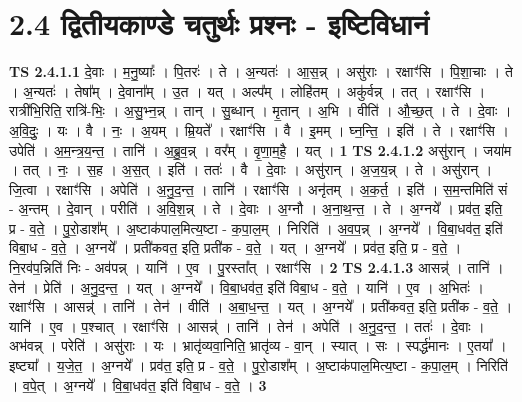 \documentclass[17pt]{extarticle}
\begin{document}
\section*{ 2.4      द्वितीयकाण्डे चतुर्थः प्रश्नः - इष्टिविधानं }
                                \textbf{ TS 2.4.1.1} \newline
                  दे॒वाः । म॒नु॒ष्याः᳚ । पि॒तरः॑ । ते । अ॒न्यतः॑ । आ॒स॒न्न् । असु॑राः । रक्षाꣳ॑सि । पि॒शा॒चाः । ते । अ॒न्यतः॑ । तेषा᳚म् । दे॒वाना᳚म् । उ॒त । यत् । अल्प᳚म् । लोहि॑तम् । अकु॑र्वन्न् । तत् । रक्षाꣳ॑सि । रात्री॑भि॒रिति॒ रात्रि॑-भिः॒ । अ॒सु॒भ्न॒न्न् । तान् । सु॒ब्धान् । मृ॒तान् । अ॒भि । वीति॑ । औ॒च्छ॒त् । ते । दे॒वाः । अ॒वि॒दुः॒ । यः । वै । नः॒ । अ॒यम् । म्रि॒यते᳚ । रक्षाꣳ॑सि । वै । इ॒मम् । घ्न॒न्ति॒ । इति॑ । ते । रक्षाꣳ॑सि । उपेति॑ । अ॒म॒न्त्र॒य॒न्त॒ । तानि॑ । अ॒ब्रु॒व॒न्न् । वर᳚म् । वृ॒णा॒म॒है॒ । यत् । \textbf{  1} \newline
                  \newline
                                \textbf{ TS 2.4.1.2} \newline
                  असु॑रान् । जया॑म । तत् । नः॒ । स॒ह । अ॒स॒त् । इति॑ । ततः॑ । वै । दे॒वाः । असु॑रान् । अ॒ज॒य॒न्न् । ते । असु॑रान् । जि॒त्वा । रक्षाꣳ॑सि । अपेति॑ । अ॒नु॒द॒न्त॒ । तानि॑ । रक्षाꣳ॑सि । अनृ॑तम् । अ॒क॒र्त॒ । इति॑ । स॒म॒न्तमिति॑ सं - अ॒न्तम् । दे॒वान् । परीति॑ । अ॒वि॒श॒न्न् । ते । दे॒वाः । अ॒ग्नौ । अ॒ना॒थ॒न्त॒ । ते । अ॒ग्नये᳚ । प्रव॑त॒ इति॒ प्र - व॒ते॒ । पु॒रो॒डाश᳚म् । अ॒ष्टाक॑पाल॒मित्य॒ष्टा - क॒पा॒ल॒म् । निरिति॑ । अ॒व॒प॒न्न् । अ॒ग्नये᳚ । वि॒बा॒धव॑त॒ इति॑ विबा॒ध - व॒ते॒ । अ॒ग्नये᳚ । प्रती॑कवत॒ इति॒ प्रती॑क - व॒ते॒ । यत् । अ॒ग्नये᳚ । प्रव॑त॒ इति॒ प्र - व॒ते॒ । नि॒रव॑प॒न्निति॑ निः - अव॑पन्न् । यानि॑ । ए॒व । पु॒रस्ता᳚त् । रक्षाꣳ॑सि । \textbf{  2} \newline
                  \newline
                                \textbf{ TS 2.4.1.3} \newline
                  आसन्न्॑ । तानि॑ । तेन॑ । प्रेति॑ । अ॒नु॒द॒न्त॒ । यत् । अ॒ग्नये᳚ । वि॒बा॒धव॑त॒ इति॑ विबा॒ध - व॒ते॒ । यानि॑ । ए॒व । अ॒भितः॑ । रक्षाꣳ॑सि । आसन्न्॑ । तानि॑ । तेन॑ । वीति॑ । अ॒बा॒ध॒न्त॒ । यत् । अ॒ग्नये᳚ । प्रती॑कवत॒ इति॒ प्रती॑क - व॒ते॒ । यानि॑ । ए॒व । प॒श्चात् । रक्षाꣳ॑सि । आसन्न्॑ । तानि॑ । तेन॑ ।   अपेति॑ । अ॒नु॒द॒न्त॒ । ततः॑ । दे॒वाः । अभ॑वन्न् । परेति॑ । असु॑राः । यः । भ्रातृ॑व्यवा॒निति॒ भ्रातृ॑व्य - वा॒न् । स्यात् । सः । स्पर्द्ध॑मानः । ए॒तया᳚ । इष्ट्या᳚ । य॒जे॒त॒ । अ॒ग्नये᳚ । प्रव॑त॒ इति॒ प्र - व॒ते॒ । पु॒रो॒डाश᳚म् । अ॒ष्टाक॑पाल॒मित्य॒ष्टा - क॒पा॒ल॒म् । निरिति॑ । व॒पे॒त् । अ॒ग्नये᳚ । वि॒बा॒धव॑त॒ इति॑ विबा॒ध - व॒ते॒ । \textbf{  3} \newline
\end{document}
